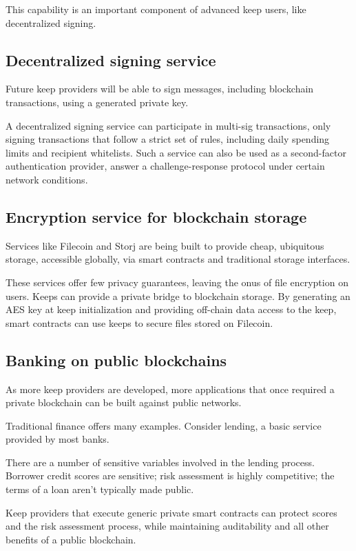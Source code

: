 \documentclass[11pt]{article}
\begin{document}
This capability is an important component of advanced keep users, like
decentralized signing.

\subsection{Decentralized signing service}

Future keep providers will be able to sign messages, including
blockchain transactions, using a generated private key.

A decentralized signing service can participate in multi-sig
transactions, only signing transactions that follow a strict set of
rules, including daily spending limits and recipient whitelists. Such
a service can also be used as a second-factor authentication provider,
answer a challenge-response protocol under certain network conditions.

\subsection{Encryption service for blockchain storage}

Services like Filecoin \cite{filecoin} and Storj \cite{storj} are
being built to provide cheap, ubiquitous storage, accessible globally,
via smart contracts and traditional storage interfaces.

These services offer few privacy guarantees, leaving the onus of file
encryption on users. Keeps can provide a private bridge to blockchain
storage. By generating an AES key at keep initialization and providing
off-chain data access to the keep, smart contracts can use keeps to
secure files stored on Filecoin.

\subsection{Banking on public blockchains}

As more keep providers are developed, more applications that once
required a private blockchain can be built against public networks.

Traditional finance offers many examples. Consider lending, a basic
service provided by most banks.

There are a number of sensitive variables involved in the lending
process. Borrower credit scores are sensitive; risk assessment is
highly competitive; the terms of a loan aren’t typically made public.

Keep providers that execute generic private smart contracts can
protect scores and the risk assessment process, while maintaining
auditability and all other benefits of a public blockchain.



\end{document}
